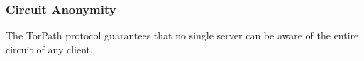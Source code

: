 \subsubsection{Circuit Anonymity} 
The TorPath protocol guarantees that no single server can be aware of the entire
circuit of any client. 








